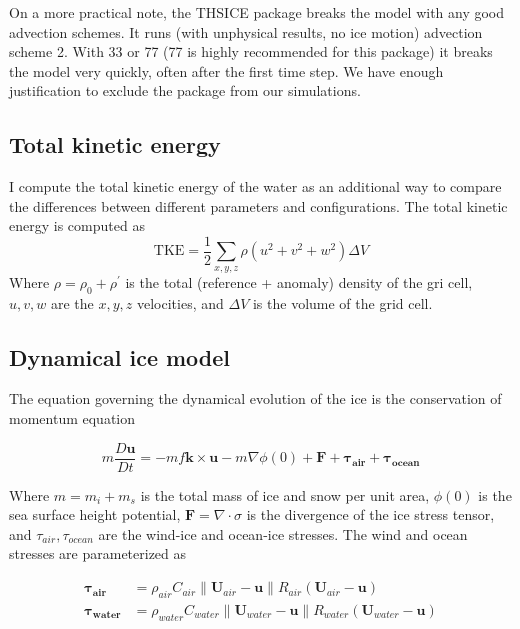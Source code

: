 \documentclass[11pt]{article}
\begin{document}
On a more practical note, the THSICE package breaks the model with any good advection schemes. It runs (with unphysical results, no ice motion) advection scheme 2. With 33 or 77 (77 is highly recommended for this package) it breaks the model very quickly, often after the first time step. We have enough justification to exclude the package from our simulations.

\subsection{Total kinetic energy}
I compute the total kinetic energy of the water as an additional way to compare the differences between different parameters and configurations. The total kinetic energy is computed as
\begin{equation}
\textrm{TKE} = \frac{1}{2} \sum_{x, y, z} \rho \left ( u^2 + v^2 + w^2\right ) \Delta V
\end{equation}
Where $\rho = \rho_0 + \rho^{\prime}$ is the total (reference + anomaly) density of the gri cell, $u, v, w$ are the $x, y, z$ velocities, and $\Delta V$ is the volume of the grid cell.

\subsection{Dynamical ice model}
\label{sec:iceDynamics}
The equation governing the dynamical evolution of the ice is the conservation of momentum equation

\begin{equation}
m \frac{D \mathbf{u}}{D t} = -m f \mathbf{k}\times \mathbf{u} - m\nabla \phi(0) + \mathbf{F} + \mathbf{\tau_{air}} + \mathbf{\tau_{ocean}}
\end{equation}

Where  $m = m_i + m_s$ is the total mass of ice and snow per unit area, $\phi(0)$ is the sea surface height potential, $\mathbf{F} = \nabla \cdot \sigma$ is the divergence of the ice stress tensor, and $\tau_{air}, \tau_{ocean}$ are the wind-ice and ocean-ice stresses. The wind and ocean stresses are parameterized as

\begin{equation}
\begin{aligned}
\mathbf{\tau_{air}} &= \rho_{air}C_{air}\left \| \mathbf{U}_{air} - \mathbf{u} \right \| R_{air}\left(\mathbf{U}_{air} - \mathbf{u}\right) \\
\mathbf{\tau_{water}} &= \rho_{water}C_{water}\left \| \mathbf{U}_{water} - \mathbf{u} \right \| R_{water}\left(\mathbf{U}_{water} - \mathbf{u}\right)
\end{aligned}
\end{equation}
\end{document}
